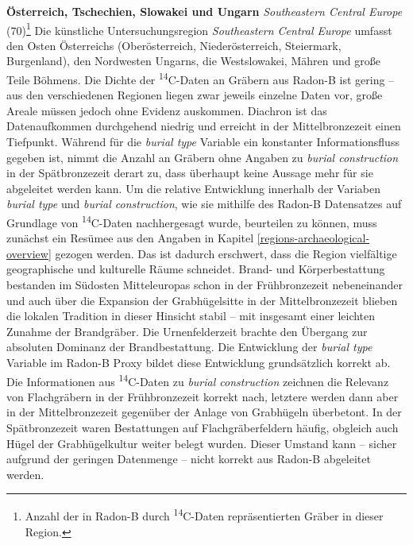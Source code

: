 \documentclass[openany,twoside,twocolumn]{book}
\let\rmarkdownfootnote\footnote%
\def\footnote{\protect\rmarkdownfootnote}
\begin{document}
\textbf{Österreich, Tschechien, Slowakei und Ungarn} \emph{Southeastern Central Europe} (70)\footnote{Anzahl der in Radon-B durch \textsuperscript{14}C-Daten repräsentierten Gräber in dieser Region.} \newline 
Die künstliche Untersuchungsregion \emph{Southeastern Central Europe} umfasst den Osten Österreichs (Oberösterreich, Niederösterreich, Steiermark, Burgenland), den Nordwesten Ungarns, die Westslowakei, Mähren und große Teile Böhmens. Die Dichte der \textsuperscript{14}C-Daten an Gräbern aus Radon-B ist gering -- aus den verschiedenen Regionen liegen zwar jeweils einzelne Daten vor, große Areale müssen jedoch ohne Evidenz auskommen. Diachron ist das Datenaufkommen durchgehend niedrig und erreicht in der Mittelbronzezeit einen Tiefpunkt. Während für die \emph{burial type} Variable ein konstanter Informationsfluss gegeben ist, nimmt die Anzahl an Gräbern ohne Angaben zu \emph{burial construction} in der Spätbronzezeit derart zu, dass überhaupt keine Aussage mehr für sie abgeleitet werden kann. Um die relative Entwicklung innerhalb der Variaben \emph{burial type} und \emph{burial construction}, wie sie mithilfe des Radon-B Datensatzes auf Grundlage von \textsuperscript{14}C-Daten nachhergesagt wurde, beurteilen zu können, muss zunächst ein Resümee aus den Angaben in Kapitel \ref{regions-archaeological-overview} gezogen werden. Das ist dadurch erschwert, dass die Region vielfältige geographische und kulturelle Räume schneidet. Brand- und Körperbestattung bestanden im Südosten Mitteleuropas schon in der Frühbronzezeit nebeneinander und auch über die Expansion der Grabhügelsitte in der Mittelbronzezeit blieben die lokalen Tradition in dieser Hinsicht stabil -- mit insgesamt einer leichten Zunahme der Brandgräber. Die Urnenfelderzeit brachte den Übergang zur absoluten Dominanz der Brandbestattung. Die Entwicklung der \emph{burial type} Variable im Radon-B Proxy bildet diese Entwicklung grundsätzlich korrekt ab. Die Informationen aus \textsuperscript{14}C-Daten zu \emph{burial construction} zeichnen die Relevanz von Flachgräbern in der Frühbronzezeit korrekt nach, letztere werden dann aber in der Mittelbronzezeit gegenüber der Anlage von Grabhügeln überbetont. In der Spätbronzezeit waren Bestattungen auf Flachgräberfeldern häufig, obgleich auch Hügel der Grabhügelkultur weiter belegt wurden. Dieser Umstand kann -- sicher aufgrund der geringen Datenmenge -- nicht korrekt aus Radon-B abgeleitet werden.
\end{document}
